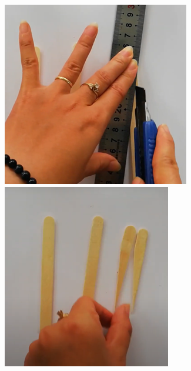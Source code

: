\begin{multicols}{2}
\begin{figure}[H]
		\includegraphics[width= 1\linewidth]{50}
		\includegraphics[width= 1\linewidth]{51}

\end{figure}
\end{multicols}
